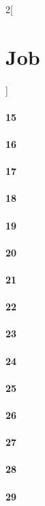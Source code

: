 \documentclass{book}
\begin{document}
\begin{multicols}{2}[\part{Job}]
\subsection*{15}
\subsection*{16}
\subsection*{17}
\subsection*{18}
\subsection*{19}
\subsection*{20}
\subsection*{21}
\subsection*{22}
\subsection*{23}
\subsection*{24}
\subsection*{25}
\subsection*{26}
\subsection*{27}
\subsection*{28}
\subsection*{29}

\end{multicols}
\end{document}
